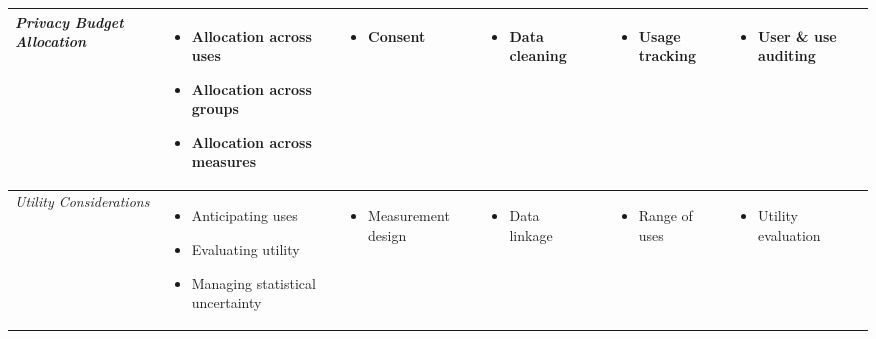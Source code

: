 \begin{sidewaystable}[p]
\begin{tabularx}{1\textwidth}{ p{0.55in} YYYYYY}
\textit{Privacy Budget Allocation} & \begin{itemize}[lifecyclesep] \item Allocation across uses \item Allocation across groups \item Allocation across measures\end{itemize} & \begin{itemize}[lifecyclesep] \item Consent\end{itemize} & \begin{itemize}[lifecyclesep] \item Data cleaning\end{itemize} &  & \begin{itemize}[lifecyclesep] \item Usage tracking\end{itemize} & \begin{itemize}[lifecyclesep] \item User \& use auditing\end{itemize} \\
\midrule

\textit{Utility Considerations} & \begin{itemize}[lifecyclesep] \item Anticipating uses \item Evaluating utility \item Managing statistical uncertainty\end{itemize} & \begin{itemize}[lifecyclesep] \item Measurement design\end{itemize} & \begin{itemize}[lifecyclesep] \item Data linkage\end{itemize} &  & \begin{itemize}[lifecyclesep] \item Range of uses\end{itemize} & \begin{itemize}[lifecyclesep] \item Utility evaluation\end{itemize} \\
\bottomrule

\end{tabularx}

\end{sidewaystable}